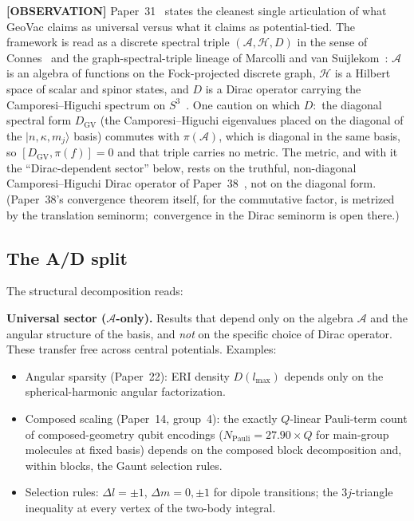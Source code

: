 \documentclass[aps,pra,twocolumn,superscriptaddress,longbibliography]{revtex4-2}
\newcommand{\gvq}[2]{#2}
\newcommand{\gvc}[2]{#2}
\begin{document}
\textbf{[OBSERVATION]} Paper~31~\cite{loutey_paper31} states the cleanest single
articulation of what GeoVac claims as universal versus what it claims
as potential-tied.  The framework is read as a discrete spectral
triple $(\mathcal{A}, \mathcal{H}, D)$ in the sense of
Connes~\cite{connes_book1994} and the graph-spectral-triple lineage of
Marcolli and van Suijlekom~\cite{marcolli_vs2014, perez_sanchez2024}:
$\mathcal{A}$ is an algebra of functions on the Fock-projected
discrete graph, $\mathcal{H}$ is a Hilbert space of scalar and spinor
states, and $D$ is a Dirac operator carrying the
Camporesi--Higuchi spectrum on $S^3$~\cite{camporesi_higuchi1996}.
One caution on which $D$:\ the diagonal spectral form $D_{\mathrm{GV}}$
(the Camporesi--Higuchi eigenvalues placed on the diagonal of the
$|n, \kappa, m_j\rangle$ basis) commutes with $\pi(\mathcal{A})$, which is
diagonal in the same basis, so $[D_{\mathrm{GV}}, \pi(f)] = 0$ and that
triple carries no metric.  The metric, and with it the ``Dirac-dependent
sector'' below, rests on the truthful, non-diagonal Camporesi--Higuchi
Dirac operator of Paper~38~\cite{loutey_paper38}, not on the diagonal
form.  (\gvc{wh1-p38-gh-convergence}{Paper~38's convergence theorem itself, for the commutative factor,
is metrized by the translation seminorm;\ convergence in the Dirac
seminorm is open there}.)

\subsection*{The A/D split}

The structural decomposition reads:

\medskip
\noindent\textbf{Universal sector ($\mathcal{A}$-only).}  Results that
depend only on the algebra $\mathcal{A}$ and the angular structure of
the basis, and \emph{not} on the specific choice of Dirac operator.
These transfer free across central potentials.  Examples:
\begin{itemize}
\item Angular sparsity (Paper~22): ERI density $D(l_{\max})$ depends
only on the spherical-harmonic angular factorization.
\item Composed scaling (Paper~14, group~4): the
exactly $Q$-linear Pauli-term count of composed-geometry qubit
encodings ($N_{\mathrm{Pauli}} = \gvq{composed_coeff}{27.90} \times Q$ for main-group molecules at fixed basis)
depends on the composed block decomposition and, within blocks, the
Gaunt selection rules.
\item Selection rules: $\Delta l = \pm 1$, $\Delta m = 0, \pm 1$ for
dipole transitions; the $3j$-triangle inequality at every vertex of
the two-body integral.
\end{itemize}
\end{document}
